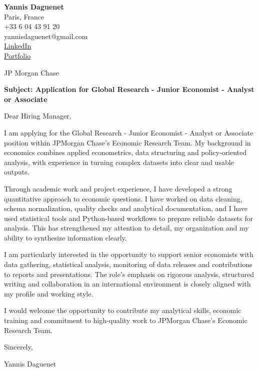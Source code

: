 \documentclass[11pt,a4paper]{article}
\begin{document}
\begin{flushleft}
\textbf{Yannis Daguenet}\\
Paris, France\\
+33 6 04 43 91 20\\
yannisdaguenet@gmail.com\\
\href{https://linkedin.com/in/yannis-daguenet}{LinkedIn}\\\href{https://daguenetyannisportfolio.netlify.app/}{Portfolio}\\\end{flushleft}

\vspace{0.25cm}


\vspace{0.15cm}

\begin{flushleft}
JP Morgan Chase\\\end{flushleft}

\vspace{0.20cm}

\textbf{Subject: Application for Global Research - Junior Economist - Analyst or Associate}

\vspace{0.25cm}

Dear Hiring Manager,

\vspace{0.18cm}

I am applying for the Global Research - Junior Economist - Analyst or Associate position within JPMorgan Chase's Economic Research Team. My background in economics combines applied econometrics, data structuring and policy-oriented analysis, with experience in turning complex datasets into clear and usable outputs.

\vspace{0.18cm}
Through academic work and project experience, I have developed a strong quantitative approach to economic questions. I have worked on data cleaning, schema normalization, quality checks and analytical documentation, and I have used statistical tools and Python-based workflows to prepare reliable datasets for analysis. This has strengthened my attention to detail, my organization and my ability to synthesize information clearly.

\vspace{0.18cm}
I am particularly interested in the opportunity to support senior economists with data gathering, statistical analysis, monitoring of data releases and contributions to reports and presentations. The role's emphasis on rigorous analysis, structured writing and collaboration in an international environment is closely aligned with my profile and working style.

\vspace{0.18cm}
I would welcome the opportunity to contribute my analytical skills, economic training and commitment to high-quality work to JPMorgan Chase's Economic Research Team.


\vspace{0.22cm}

Sincerely,

\vspace{0.28cm}

Yannis Daguenet
\end{document}
